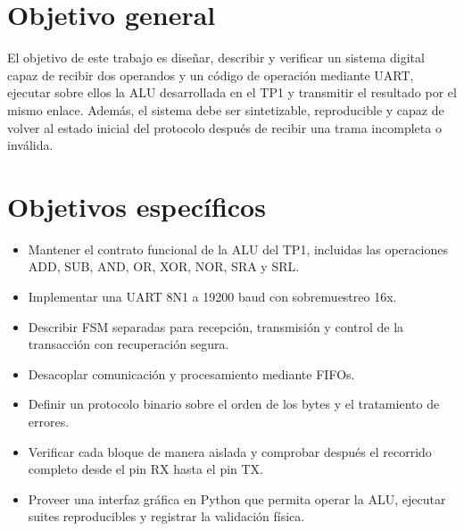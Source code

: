 \section{Objetivo general}

El objetivo de este trabajo es diseñar, describir y verificar un
sistema digital capaz de recibir dos operandos y un código de
operación mediante UART, ejecutar sobre ellos la ALU desarrollada en
el TP1 y transmitir el resultado por el mismo enlace. Además, el
sistema debe ser sintetizable, reproducible y capaz de volver al
estado inicial del protocolo después de recibir una trama incompleta o inválida.

\section{Objetivos específicos}

\begin{itemize}
  \item Mantener el contrato funcional de la ALU del TP1, incluidas las
    operaciones ADD, SUB, AND, OR, XOR, NOR, SRA y SRL.
  \item Implementar una UART 8N1 a \num{19200} baud con sobremuestreo 16x.
  \item Describir FSM separadas para re\-cep\-ción, transmisión y control
    de la tran\-sac\-ción con recuperación segura.
  \item Desacoplar comunicación y procesamiento mediante FIFOs.
  \item Definir un protocolo binario sobre el orden de los bytes y el
    tratamiento de errores.
  \item Verificar cada bloque de manera aislada y comprobar después el recorrido
    completo desde el pin RX hasta el pin TX.
  \item Proveer una interfaz gráfica en Python que permita operar la ALU,
    ejecutar suites reproducibles y registrar la validación física.
\end{itemize}
